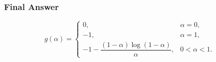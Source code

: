 \subsubsection*{Final Answer}

\[
\boxed{
g(\alpha)=
\begin{cases}
0, & \alpha=0,\\
-1, & \alpha=1,\\
-1-\dfrac{(1-\alpha)\log(1-\alpha)}{\alpha}, & 0<\alpha<1.
\end{cases}
}
\]
